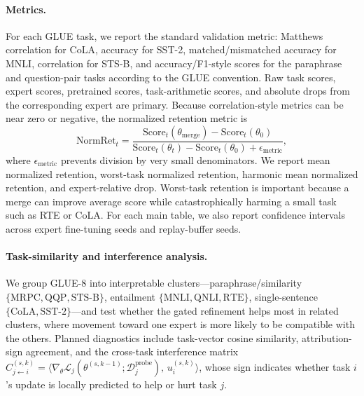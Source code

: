\documentclass[11pt]{article}
\newcommand{\thetab}{\theta_0}
\newcommand{\loss}{\mathcal{L}}
\newcommand{\data}{\mathcal{D}}
\begin{document}
\paragraph{Metrics.}
For each GLUE task, we report the standard validation metric: Matthews correlation for CoLA, accuracy for SST-2, matched/mismatched accuracy for MNLI, correlation for STS-B, and accuracy/F1-style scores for the paraphrase and question-pair tasks according to the GLUE convention. Raw task scores, expert scores, pretrained scores, task-arithmetic scores, and absolute drops from the corresponding expert are primary. Because correlation-style metrics can be near zero or negative, the normalized retention metric is
\begin{equation}
    \mathrm{NormRet}_t
    =
    \frac{
        \mathrm{Score}_t(\theta_{\mathrm{merge}})-\mathrm{Score}_t(\thetab)
    }{
        \mathrm{Score}_t(\theta_t)-\mathrm{Score}_t(\thetab)+\epsilon_{\mathrm{metric}}
    },
    \label{eq:normalized-retention}
\end{equation}
where $\epsilon_{\mathrm{metric}}$ prevents division by very small denominators. We report mean normalized retention, worst-task normalized retention, harmonic mean normalized retention, and expert-relative drop. Worst-task retention is important because a merge can improve average score while catastrophically harming a small task such as RTE or CoLA. For each main table, we also report confidence intervals across expert fine-tuning seeds and replay-buffer seeds.

\paragraph{Task-similarity and interference analysis.}
We group GLUE-8 into interpretable clusters---paraphrase/similarity $\{\mathrm{MRPC},\mathrm{QQP},\mathrm{STS\mbox{-}B}\}$, entailment $\{\mathrm{MNLI},\mathrm{QNLI},\mathrm{RTE}\}$, single-sentence $\{\mathrm{CoLA},\mathrm{SST\mbox{-}2}\}$---and test whether the gated refinement helps most in related clusters, where movement toward one expert is more likely to be compatible with the others. Planned diagnostics include task-vector cosine similarity, attribution-sign agreement, and the cross-task interference matrix $C_{j\leftarrow i}^{(s,k)}=\langle\nabla_\theta \loss_j(\theta^{(s,k-1)};\data_j^{\mathrm{probe}}),\,u_i^{(s,k)}\rangle$, whose sign indicates whether task $i$'s update is locally predicted to help or hurt task $j$.
\end{document}
